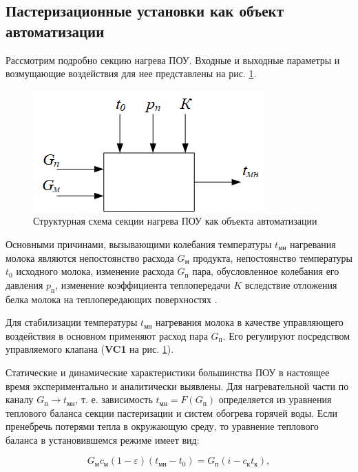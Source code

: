 \subsection{Пастеризационные установки как объект автоматизации}

Рассмотрим подробно секцию нагрева ПОУ. Входные и выходные параметры и возмущающие воздействия для нее представлены на рис. \ref{fig:Pasterizer_heat_section}.

\begin{figure}[H]
    \centering
    \includegraphics{images/chapter_2/Pasterizer_heat_section.png}
    \caption{Структурная схема секции нагрева ПОУ как объекта автоматизации}
    \label{fig:Pasterizer_heat_section}
\end{figure}

Основными причинами, вызывающими колебания температуры $t_\text{мн}$ нагревания молока являются непостоянство расхода $G_\text{м}$ продукта, непостоянство температуры $t_0$ исходного молока, изменение расхода $G_\text{п}$ пара, обусловленное колебания его давления $p_\text{п}$, изменение коэффициента теплопередачи $K$ вследствие отложения белка молока на теплопередающих поверхностях \cite{Вайнберг1978}.

Для стабилизации температуры $t_\text{мн}$ нагревания молока в качестве управляющего воздействия в основном применяют расход пара $G_\text{п}$. Его регулируют посредством управляемого клапана (\textbf{VC1} на рис. \ref{fig:Pasterizer_heat_section}).

Статические и динамические характеристики большинства ПОУ в настоящее время экспериментально и аналитически выявлены. Для нагревательной части по каналу $G_\text{п} \rightarrow t_\text{мн}$, т. е. зависимость $t_\text{мн}=F(G_\text{п})$ определяется из уравнения теплового баланса секции пастеризации и систем обогрева горячей воды. Если пренебречь потерями тепла в окружающую среду, то уравнение теплового баланса в установившемся режиме имеет вид:

\begin{equation}
    G_\text{м} c_\text{м}(1 - \varepsilon)(t_\text{мн} - t_0) = G_\text{п}(i - c_\text{к} t_\text{к}),
\end{equation}


